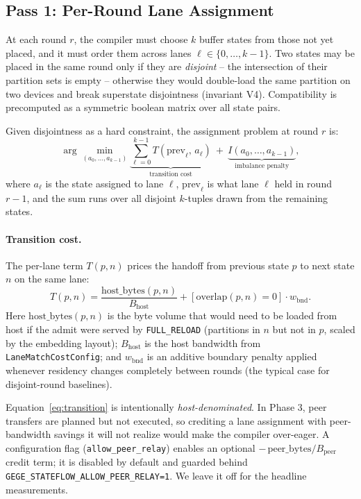 \subsection{Pass 1: Per-Round Lane Assignment}\label{sec:compiler:assign}

At each round $r$, the compiler must choose $k$ buffer states from
those not yet placed, and it must order them across lanes
$\ell \in \{0, \dots, k-1\}$. Two states may be placed in the same
round only if they are \emph{disjoint} -- the intersection of their
partition sets is empty -- otherwise they would double-load the same
partition on two devices and break superstate disjointness (invariant
V4). Compatibility is precomputed as a symmetric boolean matrix over
all state pairs.

Given disjointness as a hard constraint, the assignment problem at
round $r$ is:
\[
\arg\min_{(a_0, \dots, a_{k-1})}
  \underbrace{\sum_{\ell=0}^{k-1}
              T(\mathrm{prev}_\ell,\, a_\ell)}_{\text{transition cost}}
  \ +\
  \underbrace{I(a_0, \dots, a_{k-1})}_{\text{imbalance penalty}},
\]
where $a_\ell$ is the state assigned to lane $\ell$,
$\mathrm{prev}_\ell$ is what lane $\ell$ held in round $r\!-\!1$, and
the sum runs over all disjoint $k$-tuples drawn from the remaining
states.

\paragraph{Transition cost.} The per-lane term $T(p, n)$ prices the
handoff from previous state $p$ to next state $n$ on the same lane:
\begin{equation}
T(p, n) = \frac{\mathrm{host\_bytes}(p, n)}{B_{\mathrm{host}}}
         + [\mathrm{overlap}(p, n) = 0] \cdot w_{\mathrm{bnd}}.
\label{eq:transition}
\end{equation}
Here $\mathrm{host\_bytes}(p, n)$ is the byte volume that would need
to be loaded from host if the admit were served by \texttt{FULL\_RELOAD}
(partitions in $n$ but not in $p$, scaled by the embedding layout);
$B_{\mathrm{host}}$ is the host bandwidth from
\texttt{LaneMatchCostConfig}; and $w_{\mathrm{bnd}}$ is an additive
boundary penalty applied whenever residency changes completely between
rounds (the typical case for disjoint-round baselines).

Equation~\ref{eq:transition} is intentionally \emph{host-denominated}.
In Phase 3, peer transfers are planned but not executed, so crediting
a lane assignment with peer-bandwidth savings it will not realize
would make the compiler over-eager. A configuration flag
(\texttt{allow\_peer\_relay}) enables an optional $-\,\mathrm{peer\_bytes}
/B_{\mathrm{peer}}$ credit term; it is disabled by default and guarded
behind \texttt{GEGE\_STATEFLOW\_ALLOW\_PEER\_RELAY=1}. We leave it off
for the headline measurements.

